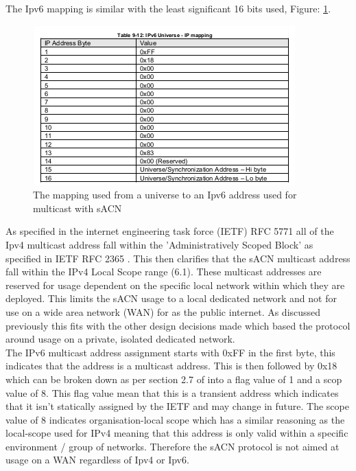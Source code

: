 \documentclass[11pt,a4paper]{report}
\begin{document}
The Ipv6 mapping is similar with the least significant 16 bits used, Figure: \ref{IPV6_MULTICAST_MAPPING}.

\begin{figure}[H]
\label{IPV6_MULTICAST_MAPPING}
\includegraphics[width=\textwidth]{Ipv6MulticastMapping}
\caption{The mapping used from a universe to an Ipv6 address used for multicast with sACN}
\end{figure}

As specified in the internet engineering task force (IETF) RFC 5771 \cite{IETF_RFC_5771} all of the Ipv4 multicast address fall within the 'Administratively Scoped Block' as specified in IETF RFC 2365 \cite{IETF_RFC_2365}. This then clarifies that the sACN multicast address fall within the IPv4 Local Scope range (6.1). These multicast addresses are reserved for usage dependent on the specific local network within which they are deployed. This limits the sACN usage to a local dedicated network and not for use on a wide area network (WAN) for as the public internet. As discussed previously this fits with the other design decisions made which based the protocol around usage on a private, isolated dedicated network.\\

The IPv6 multicast address assignment starts with 0xFF in the first byte, this indicates that the address is a multicast address. This is then followed by 0x18 which can be broken down as per section 2.7 of \cite{IETF_RFC_4291} into a flag value of 1 and a scop value of 8. This flag value mean that this is a transient address which indicates that it isn't statically assigned by the IETF and may change in future. The scope value of 8 indicates organisation-local scope which has a similar reasoning as the local-scope used for IPv4 meaning that this address is only valid within a specific environment / group of networks. Therefore the sACN protocol is not aimed at usage on a WAN regardless of Ipv4 or Ipv6. 
\end{document}
